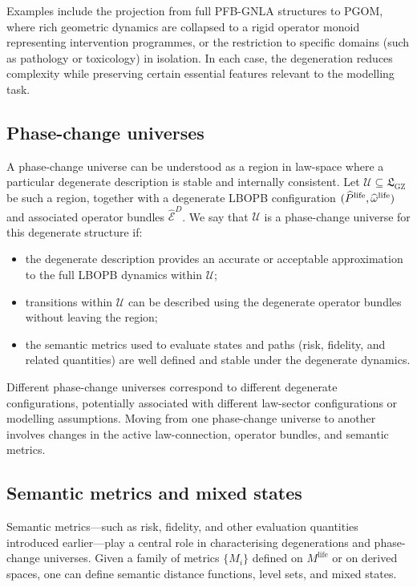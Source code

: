 \documentclass[11pt]{book}
\theoremstyle{plain}
\theoremstyle{definition}
\theoremstyle{remark}
\newcommand{\GZLS}{\ensuremath{\mathfrak{L}_{\mathrm{GZ}}}}       \newcommand{\GZLT}{\ensuremath{M_{!w}}}                           \newcommand{\GZLOC}{\ensuremath{A_M}}                             \newcommand{\GZLCurv}{\ensuremath{\mathcal{F}_{\mathrm{law}}}}
\begin{document}
Examples include the projection from full PFB-GNLA structures to PGOM,
where rich geometric dynamics are collapsed to a rigid operator monoid
representing intervention programmes, or the restriction to specific
domains (such as pathology or toxicology) in isolation. In each case,
the degeneration reduces complexity while preserving certain essential
features relevant to the modelling task.

\subsection*{Phase-change universes}

A phase-change universe can be understood as a region in law-space
where a particular degenerate description is stable and internally
consistent. Let $\mathcal{U} \subseteq \GZLS$ be such a region,
together with a degenerate LBOPB configuration
$(\widehat{P}^{\mathrm{life}}, \widehat{\omega}^{\mathrm{life}})$ and
associated operator bundles $\widehat{\mathcal{E}}^{D}$. We say that
$\mathcal{U}$ is a phase-change universe for this degenerate structure
if:

\begin{itemize}
  \item the degenerate description provides an accurate or acceptable
        approximation to the full LBOPB dynamics within $\mathcal{U}$;
  \item transitions within $\mathcal{U}$ can be described using the
        degenerate operator bundles without leaving the region;
  \item the semantic metrics used to evaluate states and paths (risk,
        fidelity, and related quantities) are well defined and stable
        under the degenerate dynamics.
\end{itemize}

Different phase-change universes correspond to different degenerate
configurations, potentially associated with different law-sector
configurations or modelling assumptions. Moving from one phase-change
universe to another involves changes in the active law-connection,
operator bundles, and semantic metrics.

\subsection*{Semantic metrics and mixed states}

Semantic metrics—such as risk, fidelity, and other evaluation
quantities introduced earlier—play a central role in characterising
degenerations and phase-change universes. Given a family of metrics
$\{M_{i}\}$ defined on $M^{\mathrm{life}}$ or on derived spaces, one
can define semantic distance functions, level sets, and mixed states.
\end{document}
